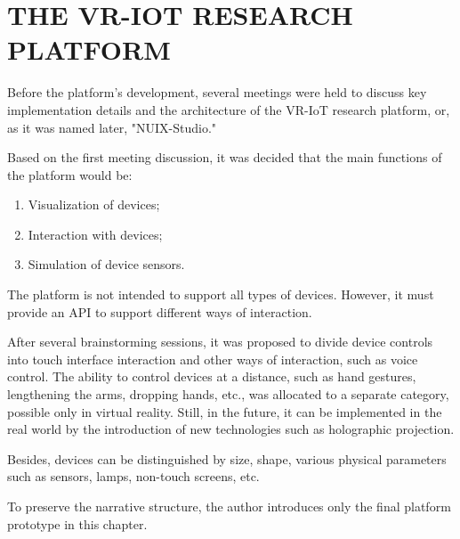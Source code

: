 
\chapter{THE VR-IOT RESEARCH PLATFORM}

Before the platform's development, several meetings were held to discuss key implementation details and the architecture of the VR-IoT research platform, or, as it was named later, "NUIX-Studio."

Based on the first meeting discussion, it was decided that the main functions of the platform would be:
\begin{enumerate}
     \item Visualization of devices;
     \item Interaction with devices;
     \item Simulation of device sensors.
\end{enumerate}

The platform is not intended to support all types of devices. However, it must provide an API to support different ways of interaction.

After several brainstorming sessions, it was proposed to divide device controls into touch interface interaction and other ways of interaction, such as voice control. The ability to control devices at a distance, such as hand gestures, lengthening the arms, dropping hands, etc., was allocated to a separate category, possible only in virtual reality. Still, in the future, it can be implemented in the real world by the introduction of new technologies such as holographic projection.

Besides, devices can be distinguished by size, shape, various physical parameters such as sensors, lamps, non-touch screens, etc.

To preserve the narrative structure, the author introduces only the final platform prototype in this chapter.

